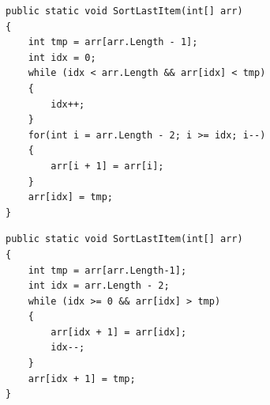 \documentclass[14pt]{extarticle}
\begin{document}
\begin{enumerate}[itemsep=2em]
    \ifwithsols
    \begin{boxSolution}[1]
    \begin{english}
    \begin{verbatim}
public static void SortLastItem(int[] arr)
{
    int tmp = arr[arr.Length - 1];
    int idx = 0;
    while (idx < arr.Length && arr[idx] < tmp)
    {
        idx++;
    }
    for(int i = arr.Length - 2; i >= idx; i--)
    {
        arr[i + 1] = arr[i];
    }
    arr[idx] = tmp;
}
    \end{verbatim}
    \end{english}
    \end{boxSolution}
    \begin{boxSolution}[2]
    \begin{english}
    \begin{verbatim}
public static void SortLastItem(int[] arr)
{
    int tmp = arr[arr.Length-1];
    int idx = arr.Length - 2;
    while (idx >= 0 && arr[idx] > tmp)
    {
        arr[idx + 1] = arr[idx];
        idx--;
    }
    arr[idx + 1] = tmp;
}
    \end{verbatim}
    \end{english}
    \end{boxSolution}
    \fi

\end{enumerate}
\end{document}
